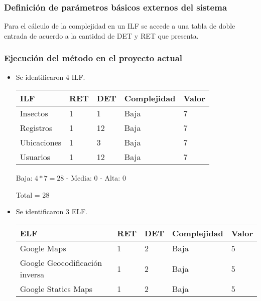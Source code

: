      \subsubsection{Definición de parámetros básicos externos del sistema}

Para el cálculo de la complejidad en un ILF se accede a una tabla de doble entrada de acuerdo a la cantidad de DET y RET que presenta.
      
      \subsubsection{Ejecución del método en el proyecto actual}

\begin{itemize}
    
    \item Se identificaron 4 ILF.
    
    \begin{table}[H]
        \centering
        \begin{tabular}{|l|l|l|l|l|}
            \hline
            ILF         & RET & DET & Complejidad & Valor \\ \hline
            Insectos    & 1   & 1   & Baja        & 7     \\ \hline
            Registros   & 1   & 12  & Baja        & 7     \\ \hline
            Ubicaciones & 1   & 3   & Baja        & 7     \\ \hline
            Usuarios    & 1   & 12  & Baja        & 7     \\ 
            \hline
        \end{tabular}
    \end{table}
    
    Baja: $4 * 7 = 28$ -
    Media: 0 -
    Alta: 0

    Total = 28
    
    \item Se identificaron 3 ELF.
    
    \begin{table}[H]
        \centering
        \begin{tabular}{|l|l|l|l|l|}
            \hline
            ELF                             & RET & DET & Complejidad & Valor \\ \hline
            Google Maps                     & 1   & 2   & Baja        & 5     \\ \hline
            Google Geocodificación inversa  & 1   & 2   & Baja        & 5     \\ \hline
            Google Statics Maps             & 1   & 2   & Baja        & 5     \\
            \hline
        \end{tabular}
    \end{table}


\end{itemize}
